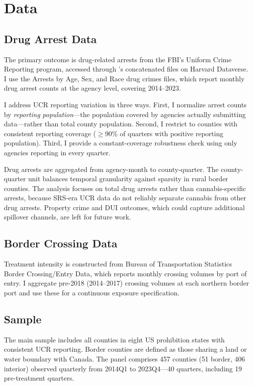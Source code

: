 \documentclass[12pt]{article}
\begin{document}
\section{Data}
\label{sec:data}

\subsection{Drug Arrest Data}

The primary outcome is drug-related arrests from the FBI's Uniform Crime Reporting program, accessed through \citet{kaplan2022}'s concatenated files on Harvard Dataverse. I use the Arrests by Age, Sex, and Race drug crimes files, which report monthly drug arrest counts at the agency level, covering 2014--2023.

I address UCR reporting variation in three ways. First, I normalize arrest counts by \textit{reporting population}---the population covered by agencies actually submitting data---rather than total county population. Second, I restrict to counties with consistent reporting coverage ($\geq$90\% of quarters with positive reporting population). Third, I provide a constant-coverage robustness check using only agencies reporting in every quarter.

Drug arrests are aggregated from agency-month to county-quarter. The county-quarter unit balances temporal granularity against sparsity in rural border counties. The analysis focuses on total drug arrests rather than cannabis-specific arrests, because SRS-era UCR data do not reliably separate cannabis from other drug arrests. Property crime and DUI outcomes, which could capture additional spillover channels, are left for future work.

\subsection{Border Crossing Data}

Treatment intensity is constructed from Bureau of Transportation Statistics Border Crossing/Entry Data, which reports monthly crossing volumes by port of entry. I aggregate pre-2018 (2014--2017) crossing volumes at each northern border port and use these for a continuous exposure specification.

\subsection{Sample}

The main sample includes all counties in eight US prohibition states with consistent UCR reporting. Border counties are defined as those sharing a land or water boundary with Canada. The panel comprises 457 counties (51 border, 406 interior) observed quarterly from 2014Q1 to 2023Q4---40 quarters, including 19 pre-treatment quarters.
\end{document}
